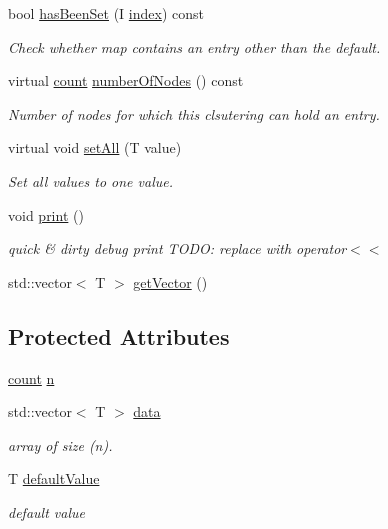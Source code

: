 \begin{DoxyCompactItemize}
bool \hyperlink{class_networ_kit_1_1_index_map_a319166184122c92f427836a89441b39e}{has\-Been\-Set} (I \hyperlink{namespace_networ_kit_a486772e5516be73694ef0d780b828d04}{index}) const 
\begin{DoxyCompactList}\small\item\em Check whether map contains an entry other than the default. \end{DoxyCompactList}\item 
virtual \hyperlink{namespace_networ_kit_a76b399edfa50ae72e4aa86007aaa800a}{count} \hyperlink{class_networ_kit_1_1_index_map_a4c265993e24718bbfebaf367c9e5dae9}{number\-Of\-Nodes} () const 
\begin{DoxyCompactList}\small\item\em Number of nodes for which this clsutering can hold an entry. \end{DoxyCompactList}\item 
virtual void \hyperlink{class_networ_kit_1_1_index_map_ac86b82fdac7adf228caaa13e11e8cb89}{set\-All} (T value)
\begin{DoxyCompactList}\small\item\em Set all values to one value. \end{DoxyCompactList}\item 
void \hyperlink{class_networ_kit_1_1_index_map_aa261d0fb3eb6e267f0ce9a8713f5c939}{print} ()
\begin{DoxyCompactList}\small\item\em quick \& dirty debug print T\-O\-D\-O\-: replace with operator$<$$<$ \end{DoxyCompactList}\item 
std\-::vector$<$ T $>$ \hyperlink{class_networ_kit_1_1_index_map_ae4d83babfd60165effcb9df7d757f2de}{get\-Vector} ()
\end{DoxyCompactItemize}
\subsection*{Protected Attributes}
\begin{DoxyCompactItemize}
\item 
\hyperlink{namespace_networ_kit_a76b399edfa50ae72e4aa86007aaa800a}{count} \hyperlink{class_networ_kit_1_1_index_map_abffdb945755f2789f33b5eb6e95430d8}{n}
\item 
std\-::vector$<$ T $>$ \hyperlink{class_networ_kit_1_1_index_map_ade29c9c1886b524dc11d0032b6063d83}{data}
\begin{DoxyCompactList}\small\item\em array of size (n). \end{DoxyCompactList}\item 
T \hyperlink{class_networ_kit_1_1_index_map_aa7b9e890a78e37f9e1fd1978b3706c4c}{default\-Value}
\begin{DoxyCompactList}\small\item\em default value \end{DoxyCompactList}\end{DoxyCompactItemize}


